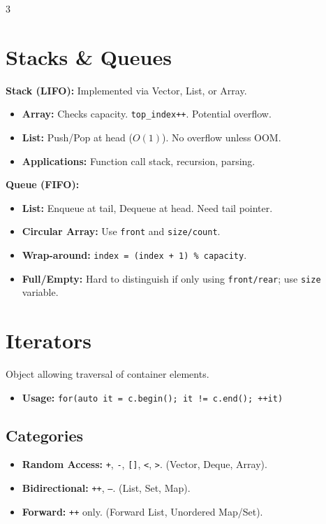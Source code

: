 \documentclass[10pt, landscape, a4paper]{article}
\begin{document}
\begin{multicols*}{3}
  \section{Stacks \& Queues}
  \textbf{Stack (LIFO):} Implemented via Vector, List, or Array.
  \begin{itemize}
    \item \textbf{Array:} Checks capacity. \texttt{top\_index++}.
      Potential overflow.
    \item \textbf{List:} Push/Pop at head ($O(1)$). No overflow unless OOM.
    \item \textbf{Applications:} Function call stack, recursion, parsing.
  \end{itemize}

  \textbf{Queue (FIFO):}
  \begin{itemize}
    \item \textbf{List:} Enqueue at tail, Dequeue at head. Need tail pointer.
    \item \textbf{Circular Array:} Use \texttt{front} and \texttt{size/count}.
    \item \textbf{Wrap-around:} \texttt{index = (index + 1) \% capacity}.
    \item \textbf{Full/Empty:} Hard to distinguish if only using
      \texttt{front/rear}; use \texttt{size} variable.
  \end{itemize}

  \section{Iterators}
  Object allowing traversal of container elements.
  \begin{itemize}
    \item \textbf{Usage:} \texttt{for(auto it = c.begin(); it != c.end(); ++it)}
  \end{itemize}

  \subsection{Categories}
  \begin{itemize}
    \item \textbf{Random Access:} \texttt{+}, \texttt{-},
      \texttt{[]}, \texttt{<}, \texttt{>}. (Vector, Deque, Array).
    \item \textbf{Bidirectional:} \texttt{++}, \texttt{--}. (List, Set, Map).
    \item \textbf{Forward:} \texttt{++} only. (Forward List, Unordered Map/Set).
  \end{itemize}


\end{multicols*}
\end{document}
